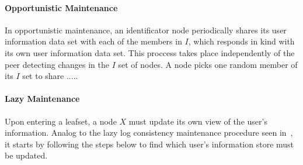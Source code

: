 
\paragraph{Opportunistic Maintenance}

In opportunistic maintenance, an identificator node periodically shares its user information
data set with each of the members in $I$, which responds in kind with its own
user information data set. This proccess takes place independently of the peer
detecting changes in the $I$ set of nodes. A node picks one random member of
its $I$ set to share .....

\paragraph{Lazy Maintenance}




Upon entering a leafset, a node $X$ must update its own view of the user's
information. Analog to the lazy log consistency maintenance procedure seen
in~\cite{p2p_certification}, it starts by following the steps below to find
which user's information store must be updated.\\

